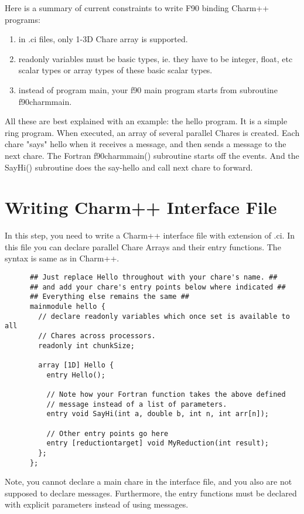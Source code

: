 \documentclass[11pt]{article}
\begin{document}
Here is a summary of current constraints to write F90 binding Charm++ programs:
\begin{enumerate}
\item in .ci files, only 1-3D Chare array is supported.
\item readonly variables must be basic types, ie. they have to be integer, 
float, etc scalar types or array types of these basic scalar types.
\item instead of program main, your f90 main program starts from subroutine 
f90charmmain.
\end{enumerate}

All these are best explained with an example: the hello program.  It is a
simple ring program.  When executed, an array of several parallel
Chares is created.  Each chare "says" hello when it receives a
message, and then sends a message to the next chare. The Fortran f90charmmain() 
subroutine starts off the events.  And the SayHi() subroutine does the 
say-hello and call next chare to forward.

\section{Writing Charm++ Interface File}
In this step, you need to write a Charm++ interface file with extension of
.ci. In this file you can declare parallel Chare Arrays and their entry 
functions. The syntax is same as in Charm++.
\begin{verbatim}
      ## Just replace Hello throughout with your chare's name. ##
      ## and add your chare's entry points below where indicated ##
      ## Everything else remains the same ##
      mainmodule hello {
        // declare readonly variables which once set is available to all
        // Chares across processors.      
        readonly int chunkSize;

        array [1D] Hello {
          entry Hello();

          // Note how your Fortran function takes the above defined
          // message instead of a list of parameters.
          entry void SayHi(int a, double b, int n, int arr[n]);

          // Other entry points go here
          entry [reductiontarget] void MyReduction(int result);
        };              
      };
\end{verbatim}
Note, you cannot declare a main chare in the interface file, and you also are not 
supposed to declare messages. Furthermore, the entry functions must be 
declared with explicit parameters instead of using messages. 
\end{document}
